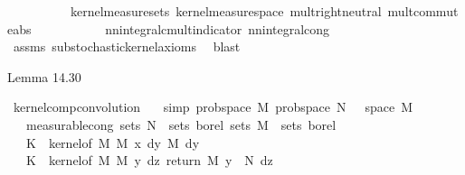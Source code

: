 \begin{isabellebody}
\ \ \ \ \ \ \ \ \ \ kernel{\isacharunderscore}{\kern0pt}measure{\isacharunderscore}{\kern0pt}sets\ kernel{\isacharunderscore}{\kern0pt}measure{\isacharunderscore}{\kern0pt}space\ mult{\isachardot}{\kern0pt}right{\isacharunderscore}{\kern0pt}neutral\ mult{\isacharunderscore}{\kern0pt}commute{\isacharunderscore}{\kern0pt}abs\ \isanewline
\ \ \ \ \ \ \ \ \ \ nn{\isacharunderscore}{\kern0pt}integral{\isacharunderscore}{\kern0pt}cmult{\isacharunderscore}{\kern0pt}indicator\ nn{\isacharunderscore}{\kern0pt}integral{\isacharunderscore}{\kern0pt}cong{\isacharparenright}{\kern0pt}\isanewline
\ \ \isamarkupfalse%
\ assms\ substochastic{\isacharunderscore}{\kern0pt}kernel{\isachardot}{\kern0pt}axioms{\isacharparenleft}{\kern0pt}{}{\isacharparenright}{\kern0pt}\ \isamarkupfalse%
\ blast{\isacharplus}{\kern0pt}\isanewline
\ \ \isamarkupfalse%
%
\endisatagproof
{\isafoldproof}%
%
\isadelimproof
%
\endisadelimproof
%
\begin{isamarkuptext}%
Lemma 14.30%
\end{isamarkuptext}\isamarkuptrue%
\isamarkupfalse%
\ kernel{\isacharunderscore}{\kern0pt}comp{\isacharunderscore}{\kern0pt}convolution{\isacharcolon}{\kern0pt}\isanewline
\ \ \ {\isacharbrackleft}{\kern0pt}simp{\isacharbrackright}{\kern0pt}{\isacharcolon}{\kern0pt}\ {\isachardoublequoteopen}prob{\isacharunderscore}{\kern0pt}space\ M{\isachardoublequoteclose}\ {\isachardoublequoteopen}prob{\isacharunderscore}{\kern0pt}space\ N{\isachardoublequoteclose}\ {\isachardoublequoteopen}{\isasymomega}\ {\isasymin}\ space\ M{\isachardoublequoteclose}\ \isanewline
\ \ \ {\isacharbrackleft}{\kern0pt}measurable{\isacharunderscore}{\kern0pt}cong{\isacharbrackright}{\kern0pt}{\isacharcolon}{\kern0pt}\ {\isachardoublequoteopen}sets\ N\ {\isacharequal}{\kern0pt}\ sets\ borel{\isachardoublequoteclose}\ {\isachardoublequoteopen}sets\ M\ {\isacharequal}{\kern0pt}\ sets\ borel{\isachardoublequoteclose}\isanewline
\ \ \ {\isachardoublequoteopen}K\ {\isasymequiv}\ kernel{\isacharunderscore}{\kern0pt}of\ M\ M\ {\isacharparenleft}{\kern0pt}{\isasymlambda}x\ dy{\isachardot}{\kern0pt}\ M\ dy{\isacharparenright}{\kern0pt}{\isachardoublequoteclose}\isanewline
\ \ \ {\isachardoublequoteopen}K\ {\isasymequiv}\ kernel{\isacharunderscore}{\kern0pt}of\ M\ M\ {\isacharparenleft}{\kern0pt}{\isasymlambda}y\ dz{\isachardot}{\kern0pt}\ {\isacharparenleft}{\kern0pt}{\isacharparenleft}{\kern0pt}return\ M\ y{\isacharparenright}{\kern0pt}\ {\isasymstar}\ N{\isacharparenright}{\kern0pt}\ dz{\isacharparenright}{\kern0pt}{\isachardoublequoteclose}\ \isanewline

\end{isabellebody}

